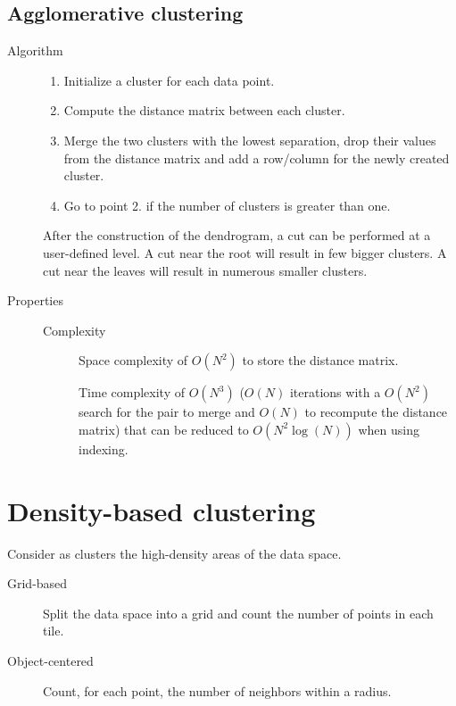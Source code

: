 \subsection{Agglomerative clustering}

\begin{description}
    \item[Algorithm]  \phantom{}
        \begin{enumerate}
            \item Initialize a cluster for each data point.
            \item Compute the distance matrix between each cluster.
            \item Merge the two clusters with the lowest separation, 
                drop their values from the distance matrix and add a row/column for the newly created cluster.
            \item Go to point 2. if the number of clusters is greater than one.
        \end{enumerate}

        After the construction of the dendrogram, a cut  can be performed at a user-defined level.
        A cut near the root will result in few bigger clusters.
        A cut near the leaves will result in numerous smaller clusters.
        

    \item[Properties] \phantom{}
        \begin{description}
            \item[Complexity] 
                Space complexity of $O(N^2)$ to store the distance matrix.
                
                Time complexity of $O(N^3)$ ($O(N)$ iterations with a $O(N^2)$ search for the pair to merge and $O(N)$ to recompute the distance matrix) 
                that can be reduced to $O(N^2\log(N))$ when using indexing.
        \end{description}
\end{description}



\section{Density-based clustering}

Consider as clusters the high-density areas of the data space.

\begin{description}
    \item[Grid-based] 
        Split the data space into a grid and count the number of points in each tile.

    \item[Object-centered] 
        Count, for each point, the number of neighbors within a radius.
\end{description}


